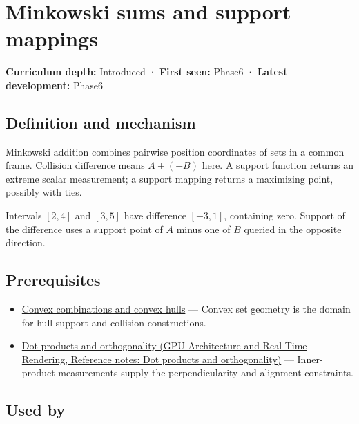 \hypertarget{appendix-215ac7099a82}{}\label{referencestart:appendix-215ac7099a82}
\section{Minkowski sums and support mappings}\label{appendix-215ac7099a82-minkowski-sums-and-support-mappings}

\textbf{Curriculum depth:} Introduced · \textbf{First seen:} Phase6 · \textbf{Latest development:} Phase6

\subsection{Definition and mechanism}\label{appendix-215ac7099a82-definition-and-mechanism}

Minkowski addition combines pairwise position coordinates of sets in a common frame. Collision difference means \(A+(-B)\) here. A support function returns an extreme scalar measurement; a support mapping returns a maximizing point, possibly with ties.

Intervals \([2,4]\) and \([3,5]\) have difference \([-3,1]\), containing zero. Support of the difference uses a support point of \(A\) minus one of \(B\) queried in the opposite direction.

\subsection{Prerequisites}\label{appendix-215ac7099a82-prerequisites}

\begin{itemize}
\tightlist
\item
  \hyperref[appendix-0026ec42c9d5]{Convex combinations and convex hulls} --- Convex set geometry is the domain for hull support and collision constructions.
\item
  \href{../06-GPU-Architecture-and-Real-Time-Rendering/main.pdf\#nameddest=appendix-8bc4e8fc547c}{Dot products and orthogonality (GPU Architecture and Real-Time Rendering, Reference notes: Dot products and orthogonality)} --- Inner-product measurements supply the perpendicularity and alignment constraints.
\end{itemize}

\subsection{Used by}\label{appendix-215ac7099a82-used-by}

